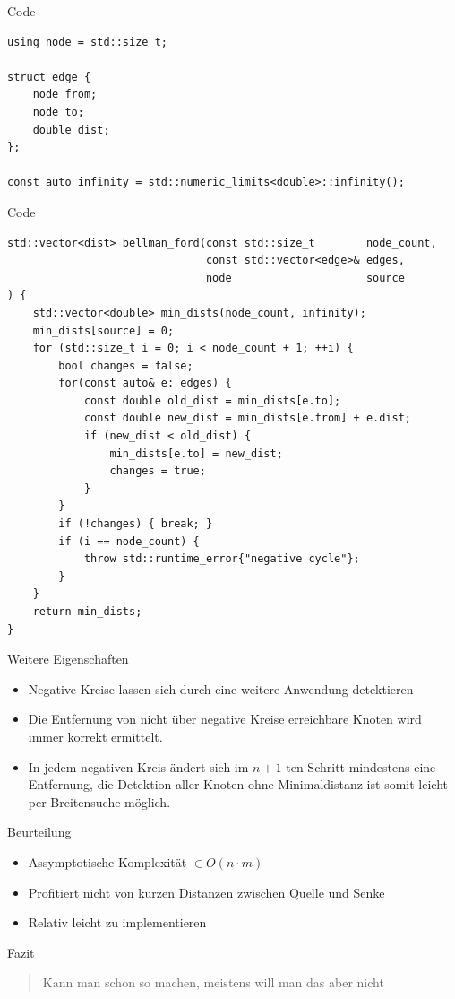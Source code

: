 \begin{frame}[fragile]{Code}
\begin{lstlisting}[basicstyle=\tiny]
using node = std::size_t;

struct edge {
    node from;
    node to;
    double dist;
};

const auto infinity = std::numeric_limits<double>::infinity();
\end{lstlisting}
\end{frame}

\begin{frame}[fragile]{Code}

\begin{lstlisting}[basicstyle=\tiny]
std::vector<dist> bellman_ford(const std::size_t        node_count,
                               const std::vector<edge>& edges,
                               node                     source
) {
    std::vector<double> min_dists(node_count, infinity);
    min_dists[source] = 0;
    for (std::size_t i = 0; i < node_count + 1; ++i) {
        bool changes = false;
        for(const auto& e: edges) {
            const double old_dist = min_dists[e.to];
            const double new_dist = min_dists[e.from] + e.dist;
            if (new_dist < old_dist) {
                min_dists[e.to] = new_dist;
                changes = true;
            }
        }
        if (!changes) { break; }
        if (i == node_count) {
            throw std::runtime_error{"negative cycle"};
        }
    }
    return min_dists;
}
\end{lstlisting}
\end{frame}

\begin{frame}{Weitere Eigenschaften}
\begin{itemize}
	\item Negative Kreise lassen sich durch eine weitere Anwendung detektieren
	\item Die Entfernung von nicht über negative Kreise erreichbare Knoten wird immer korrekt ermittelt.
	\item In jedem negativen Kreis ändert sich im $n + 1$-ten Schritt mindestens eine Entfernung,
		die Detektion aller Knoten ohne Minimaldistanz ist somit leicht per Breitensuche möglich.
\end{itemize}
\end{frame}

\begin{frame}{Beurteilung}
\begin{itemize}
\itemsep1pt\parskip0pt
\item
  Assymptotische Komplexität $\in O(n \cdot m)$
\item
  Profitiert nicht von kurzen Distanzen zwischen Quelle und Senke
\item
  Relativ leicht zu implementieren
\end{itemize}

\end{frame}

\begin{frame}{Fazit}

\begin{quote}
Kann man schon so machen, meistens will man das aber nicht
\end{quote}

\end{frame}
